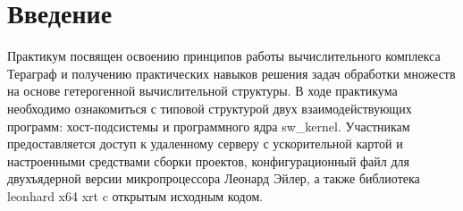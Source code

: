 \chapter*{Введение}

Практикум посвящен освоению принципов работы вычислительного комплекса
Тераграф и получению практических навыков решения задач обработки множеств
на основе гетерогенной вычислительной структуры. В ходе практикума
необходимо ознакомиться с типовой структурой двух взаимодействующих
программ: хост-подсистемы и программного ядра sw\_kernel. Участникам
предоставляется доступ к удаленному серверу с ускорительной картой и
настроенными средствами сборки проектов, конфигурационный файл для
двухъядерной версии микропроцессора Леонард Эйлер, а также библиотека
leonhard x64 xrt c открытым исходным кодом.

